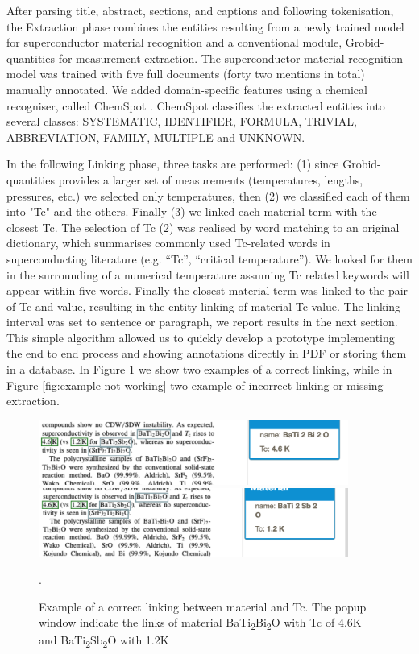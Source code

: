 \documentclass{article}[a4]
\begin{document}
After parsing title, abstract, sections, and captions and following tokenisation, the Extraction phase combines the entities resulting from a newly trained model for superconductor material recognition and a conventional module, Grobid-quantities for measurement extraction. The superconductor material recognition model was trained with five full documents (forty two mentions in total) manually annotated. We added domain-specific features using a chemical recogniser, called ChemSpot \cite{10.1093/bioinformatics/bts183}. ChemSpot classifies the extracted entities into several classes: SYSTEMATIC, IDENTIFIER, FORMULA, TRIVIAL, ABBREVIATION, FAMILY, MULTIPLE and UNKNOWN.

In the following Linking phase, three tasks are performed: (1) since Grobid-quantities provides a larger set of measurements (temperatures, lengths, pressures, etc.) we selected only temperatures, then (2) we classified each of them into "Tc" and the others. Finally (3) we linked each material term with the closest Tc. 
The selection of Tc (2) was realised by word matching to an original dictionary, which summarises commonly used Tc-related words in superconducting literature (e.g. “Tc”, “critical temperature”). We looked for them in the surrounding of a numerical temperature assuming Tc related keywords will appear within five words. 
Finally the closest material term was linked to the pair of Tc and value, resulting in the entity linking of material-Tc-value. The linking interval was set to sentence or paragraph, we report results in the next section.
This simple algorithm allowed us to quickly develop a prototype implementing the end to end process and showing annotations directly in PDF or storing them in a database. In Figure \ref{fig:example-working} we show two examples of a correct linking, while in Figure \ref{fig:example-not-working} two example of incorrect linking or missing extraction. 

\begin{figure}[h]
    \centering
    \includegraphics[width=4in]{example1} 
    \includegraphics[width=4in]{example2}
    \caption{Example of a correct linking between material and Tc. The popup window indicate the links of material BaTi\textsubscript{2}Bi\textsubscript{2}O with Tc of 4.6K and BaTi\textsubscript{2}Sb\textsubscript{2}O with 1.2K}.
    \label{fig:example-working}
\end{figure}
\end{document}
